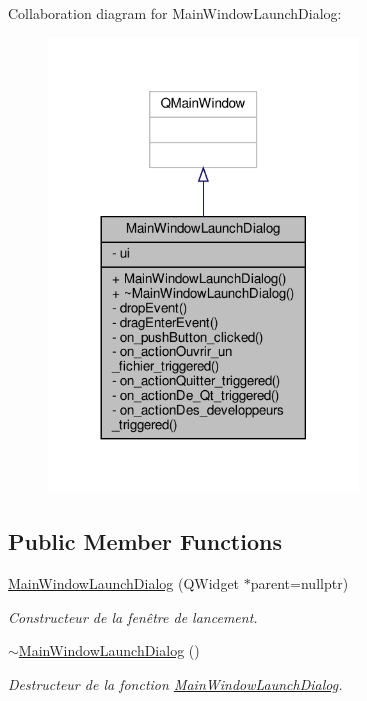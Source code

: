 Collaboration diagram for Main\+Window\+Launch\+Dialog\+:
\nopagebreak
\begin{figure}[H]
\begin{center}
\leavevmode
\includegraphics[width=233pt]{classMainWindowLaunchDialog__coll__graph}
\end{center}
\end{figure}
\subsection*{Public Member Functions}
\begin{DoxyCompactItemize}
\item 
\hyperlink{classMainWindowLaunchDialog_a9f7ef6d5da5eff43adb6ea835f0790d0}{Main\+Window\+Launch\+Dialog} (Q\+Widget $\ast$parent=nullptr)
\begin{DoxyCompactList}\small\item\em Constructeur de la fenêtre de lancement. \end{DoxyCompactList}\item 
\hyperlink{classMainWindowLaunchDialog_abf8a63fe899ba6d8fcbdf179122dfcb7}{$\sim$\+Main\+Window\+Launch\+Dialog} ()
\begin{DoxyCompactList}\small\item\em Destructeur de la fonction \hyperlink{classMainWindowLaunchDialog}{Main\+Window\+Launch\+Dialog}. \end{DoxyCompactList}\end{DoxyCompactItemize}
